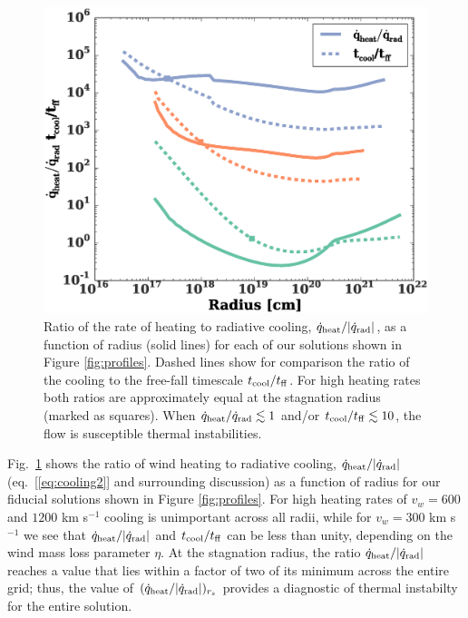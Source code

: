 \documentclass[usenatbib,fleqn]{mn2e}
\newcommand{\tcool}{t_{\rm cool}}
\newcommand{\tff}{t_{\rm ff}}
\begin{document}
\begin{figure}
  \includegraphics[width=\columnwidth]{cooling.eps}
  \caption{\label{fig:cooling} Ratio of the rate of heating to
radiative cooling, $\dot{q}_{\rm heat}/|\dot{q}_{\rm rad}|$, as a
function of radius (solid lines) for each of our solutions shown in
Figure \ref{fig:profiles}.  Dashed lines show for comparison the ratio
of the cooling to the free-fall timescale $t_{\rm cool}/t_{\rm ff}$.
For high heating rates both ratios are approximately equal at the
stagnation radius (marked as squares).  When $\dot{q}_{\rm
heat}/\dot{q}_{\rm rad} \lesssim 1$ and/or $t_{\rm cool}/t_{\rm ff}
\lesssim 10$, the flow is susceptible thermal instabilities.}
\end{figure}


Fig.~\ref{fig:cooling} shows the ratio of wind heating to radiative
cooling, $\dot{q}_{\rm heat}/|\dot{q}_{\rm rad}|$
(eq.~[\ref{eq:cooling2}] and surrounding discussion) as a function of
radius for our fiducial solutions shown in Figure \ref{fig:profiles}.
For high heating rates of $v_{w} = 600$ and $1200$ km s$^{-1}$ cooling
is unimportant across all radii, while for $v_{w} = 300$ km s$^{-1}$
we see that $\dot{q}_{\rm heat}/|\dot{q}_{\rm rad}|$ and $\tcool/\tff$
can be less than unity, depending on the wind mass loss parameter
$\eta$.  At the stagnation radius, the ratio $\dot{q}_{\rm
  heat}/|\dot{q}_{\rm rad}|$ reaches a value that lies within a factor
of two of its minimum across the entire grid; thus, the value of
$(\dot{q}_{\rm heat}/|\dot{q}_{\rm rad}|)_{r_{s}}$ provides a
diagnostic of thermal instabilty for the entire solution.
\end{document}
